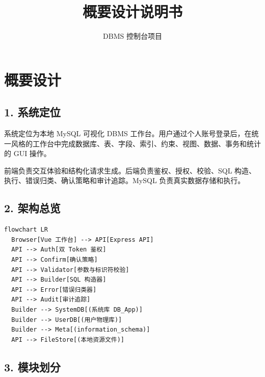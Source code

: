 \documentclass[
  a4paper,
  UTF8]{ctexart}
\title{概要设计说明书}
\author{DBMS 控制台项目}
\date{}
\begin{document}
\maketitle

\renewcommand*\contentsname{目录}
{
\hypersetup{linkcolor=}
\setcounter{tocdepth}{3}
\tableofcontents
}
\hypertarget{ux6982ux8981ux8bbeux8ba1}{%
\section{概要设计}\label{ux6982ux8981ux8bbeux8ba1}}

\hypertarget{ux7cfbux7edfux5b9aux4f4d}{%
\subsection{1. 系统定位}\label{ux7cfbux7edfux5b9aux4f4d}}

系统定位为本地 MySQL 可视化 DBMS
工作台。用户通过个人账号登录后，在统一风格的工作台中完成数据库、表、字段、索引、约束、视图、数据、事务和统计的
GUI 操作。

前端负责交互体验和结构化请求生成。后端负责鉴权、授权、校验、SQL
构造、执行、错误归类、确认策略和审计追踪。MySQL 负责真实数据存储和执行。

\hypertarget{ux67b6ux6784ux603bux89c8}{%
\subsection{2. 架构总览}\label{ux67b6ux6784ux603bux89c8}}

\begin{verbatim}
flowchart LR
  Browser[Vue 工作台] --> API[Express API]
  API --> Auth[双 Token 鉴权]
  API --> Confirm[确认策略]
  API --> Validator[参数与标识符校验]
  API --> Builder[SQL 构造器]
  API --> Error[错误归类器]
  API --> Audit[审计追踪]
  Builder --> SystemDB[(系统库 DB_App)]
  Builder --> UserDB[(用户物理库)]
  Builder --> Meta[(information_schema)]
  API --> FileStore[(本地资源文件)]
\end{verbatim}

\hypertarget{ux6a21ux5757ux5212ux5206}{%
\subsection{3. 模块划分}\label{ux6a21ux5757ux5212ux5206}}
\end{document}
